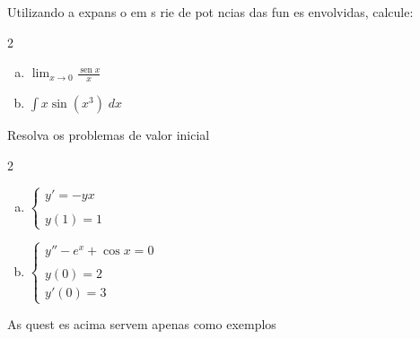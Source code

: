 \documentclass{article}
\begin{document}
\begin{questions}
\question[1\half] Utilizando a expans o em s rie de pot ncias das fun es envolvidas, calcule:
\begin{multicols}{2}
\begin{enumerate}[a)]
\item $\lim _{x \rightarrow 0} \frac{\operatorname{sen} x}{x}$
\item $\int x\sin(x^3)\;dx$
\end{enumerate}
\end{multicols}
\question[2] Resolva os problemas de valor inicial
\begin{multicols}{2}
\begin{enumerate}[a)]
    \item $\left\{\begin{array}{l} y'=-yx\\\\ y(1) = 1\end{array}\right.$
    \item $\left\{\begin{array}{l} y''-e^x+\cos x=0\\\\y(0)=2\\ y'(0)=3\end{array}\right.$
\end{enumerate}
\end{multicols}
\question[2] As quest es acima servem apenas como exemplos

\end{questions}
\end{document}
